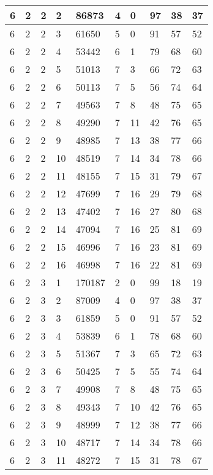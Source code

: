 \begin{table}[!ht]
\begin{tabular}{|l|l|l|l|l|l|l|l|l|l|}
        6 & 2 & 2 & 2 & 86873 & 4 & 0 & 97 & 38 & 37 \\ \hline
        6 & 2 & 2 & 3 & 61650 & 5 & 0 & 91 & 57 & 52 \\ \hline
        6 & 2 & 2 & 4 & 53442 & 6 & 1 & 79 & 68 & 60 \\ \hline
        6 & 2 & 2 & 5 & 51013 & 7 & 3 & 66 & 72 & 63 \\ \hline
        6 & 2 & 2 & 6 & 50113 & 7 & 5 & 56 & 74 & 64 \\ \hline
        6 & 2 & 2 & 7 & 49563 & 7 & 8 & 48 & 75 & 65 \\ \hline
        6 & 2 & 2 & 8 & 49290 & 7 & 11 & 42 & 76 & 65 \\ \hline
        6 & 2 & 2 & 9 & 48985 & 7 & 13 & 38 & 77 & 66 \\ \hline
        6 & 2 & 2 & 10 & 48519 & 7 & 14 & 34 & 78 & 66 \\ \hline
        6 & 2 & 2 & 11 & 48155 & 7 & 15 & 31 & 79 & 67 \\ \hline
        6 & 2 & 2 & 12 & 47699 & 7 & 16 & 29 & 79 & 68 \\ \hline
        6 & 2 & 2 & 13 & 47402 & 7 & 16 & 27 & 80 & 68 \\ \hline
        6 & 2 & 2 & 14 & 47094 & 7 & 16 & 25 & 81 & 69 \\ \hline
        6 & 2 & 2 & 15 & 46996 & 7 & 16 & 23 & 81 & 69 \\ \hline
        6 & 2 & 2 & 16 & 46998 & 7 & 16 & 22 & 81 & 69 \\ \hline
        6 & 2 & 3 & 1 & 170187 & 2 & 0 & 99 & 18 & 19 \\ \hline
        6 & 2 & 3 & 2 & 87009 & 4 & 0 & 97 & 38 & 37 \\ \hline
        6 & 2 & 3 & 3 & 61859 & 5 & 0 & 91 & 57 & 52 \\ \hline
        6 & 2 & 3 & 4 & 53839 & 6 & 1 & 78 & 68 & 60 \\ \hline
        6 & 2 & 3 & 5 & 51367 & 7 & 3 & 65 & 72 & 63 \\ \hline
        6 & 2 & 3 & 6 & 50425 & 7 & 5 & 55 & 74 & 64 \\ \hline
        6 & 2 & 3 & 7 & 49908 & 7 & 8 & 48 & 75 & 65 \\ \hline
        6 & 2 & 3 & 8 & 49343 & 7 & 10 & 42 & 76 & 65 \\ \hline
        6 & 2 & 3 & 9 & 48999 & 7 & 12 & 38 & 77 & 66 \\ \hline
        6 & 2 & 3 & 10 & 48717 & 7 & 14 & 34 & 78 & 66 \\ \hline
        6 & 2 & 3 & 11 & 48272 & 7 & 15 & 31 & 78 & 67 \\ \hline

\end{tabular}
\end{table}
